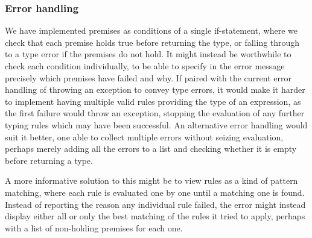 \documentclass[nofilelist]{cslthse-msc}
\newcommand{\CR}[1]{\textcolor{green!60!black}{[\textbf{CR}:#1]}}
\begin{document}

\subsubsection{Error handling}
We have implemented premises as conditions of a single if-statement, where we check that each premise holds true before returning the type, or falling through to a type error if the premises do not hold.
It might instead be worthwhile to check each condition individually, to be able to specify in the error message precisely which premises have failed and why.
If paired with the current error handling of throwing an exception to convey type errors, it would make it harder to implement having multiple valid rules providing the type of an expression, as the first failure would throw an exception, stopping the evaluation of any further typing rules which may have been successful.
An alternative error handling would suit it better, one able to collect multiple errors without seizing evaluation, perhaps merely adding all the errors to a list and checking whether it is empty before returning a type.

A more informative solution to this might be to view rules as a kind of pattern matching, where each rule is evaluated one by one until a matching one is found.
Instead of reporting the reason any individual rule failed, the error might instead display either all or only the best matching of the rules it tried to apply, perhaps with a list of non-holding premises for each one.
%
\end{document}
